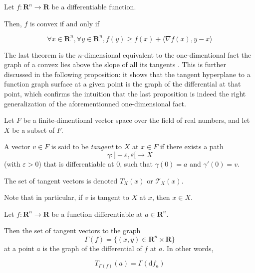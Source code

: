 \begin{proposition}
    Let $ f : \mathbf R^n \to \mathbf R $ be a differentiable function.

    Then, $ f $ is convex if and only if

    \[
        \forall x \in \mathbf R^n, \forall y \in \mathbf R^n, f(y) \geqslant f(x) + \langle \nabla f(x), y - x \rangle
    \]
\end{proposition}

\begin{remark}
    The last theorem is the $n$-dimensional equivalent to the one-dimentional fact \og the graph of a convex lies above the slope of all its tangents \fg. This is further discussed in the following proposition: it shows that the tangent hyperplane to a function graph surface at a given point is the graph of the differential at that point, which confirms the intuition that the last proposition is indeed the right generalization of the aforementionned one-dimensional fact.
\end{remark}

\begin{definition}
    Let $ F $ be a finite-dimentional vector space over the field of real numbers, and let $ X $ be a subset of $ F $. 

    A vector $ v \in F $ is said to be \textit{tangent} to $ X $ at $ x \in F $ if there exists a path
    \[
        \gamma : ]-\varepsilon, \varepsilon[ \to X
    \]
    (with $ \varepsilon > 0 $) that is differentiable at $ 0 $, such that $ \gamma(0) = a $ and $ \gamma'(0) = v $.

    The set of tangent vectors is denoted $ T_X(x) $ or $ \mathcal T_X(x) $.
\end{definition}

\begin{remark}
    Note that in particular, if $ v $ is tangent to $ X $ at $ x $, then $ x \in X $.
\end{remark}

\begin{proposition}
    Let $ f : \mathbf R^n \to \mathbf R $ be a function differentiable at $ a \in \mathbf R^n $.
    
    Then the set of tangent vectors to the graph
    \[
        \Gamma(f) = \{ (x,y) \in \mathbf R^n \times \mathbf R \}
    \]
    at a point $ a $ is the graph of the differential of $ f $ at $ a $. In other words,

    \[
        T_{\Gamma(f)}(a) = \Gamma(\mathrm d f_a)
    \]
\end{proposition}

